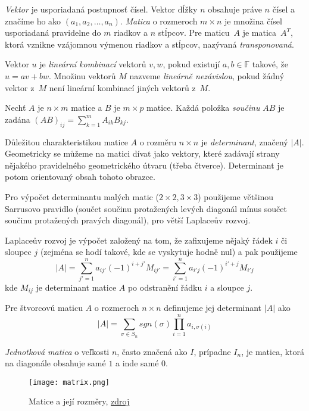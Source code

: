 {\em Vektor} je usporiadaná postupnosť čísel. Vektor dĺžky $n$ obsahuje práve $n$ čísel
a značíme ho ako $(a_1, a_2, \ldots, a_n)$. {\em Matica} o rozmeroch $m \times n$ je množina čísel
usporiadaná pravidelne do $m$ riadkov a $n$ stĺpcov. Pre maticu~$A$ je 
matica~$A^T$, ktorá vznikne vzájomnou výmenou riadkov a stĺpcov,
nazývaná {\em transponovaná}.

Vektor $u$ je {\em lineární kombinací} vektorů $v, w$, pokud existují
$a,b \in \mathbb{F}$ takové, že $u = av + bw$.
Množinu vektorů $M$ nazveme {\em lineárně nezávislou}, pokud žádný
vektor z~$M$ není lineární kombinací jiných vektorů z~$M$.

\begin{definition}
    Nechť $A$ je $n \times m$ matice a $B$ je $m \times p$ matice.
    Každá položka {\em součinu} $AB$ je zadána
    $(AB)_{ij} = \sum^{m}_{k = 1} A_{ik} B_{kj}$.
\end{definition}


Důležitou charakteristikou matice $A$ o rozměru $n \times n$ je {\em
determinant}, značený $\lvert A \rvert$. Geometricky se můžeme na matici
dívat jako vektory, které zadávají strany nějakého pravidelného
geometrického útvaru (třeba čtverce). Determinant je potom orientovaný
obsah tohoto obrazce.

Pro výpočet determinantu malých matic ($2\times2,
3\times3$) použijeme většinou Sarrusovo pravidlo (součet součinu
protažených levých diagonál mínus součet součinu protažených pravých
diagonál), pro větší
Laplaceův rozvoj.

Laplaceův rozvoj je výpočet založený na tom, že zafixujeme nějaký řádek
$i$ či sloupec $j$ (zejména se hodí takové, kde se vyskytuje hodně nul)
a pak použijeme
\[
    \lvert A \rvert
    = \sum_{j' = 1}^{n} a_{ij'} (-1)^{i + j'} M_{ij'}
    = \sum_{i' = 1}^{n} a_{i'j} (-1)^{i' + j} M_{i'j}
\]
kde $M_{ij}$ je determinant matice $A$ po odstranění řádku $i$ a sloupce
$j$.

\begin{definition}
	Pre štvorcovú maticu $A$ o rozmeroch $n \times n$ definujeme jej determinant $|A|$ ako
	\[
		|A|= \sum_{\sigma \in S_n} sgn(\sigma) \prod_{i=1}^n a_{i, \sigma(i)}
	\]
\end{definition}

{\em Jednotková matica} o veľkosti $n$, často značená ako $I$, prípadne $I_n$,
je matica, ktorá na diagonále obsahuje samé $1$ a inde samé $0$.

\begin{figure}[h]
    \centering
    \texttt{[image: matrix.png]}
    \caption{Matice a její rozměry, \href{https://commons.wikimedia.org/wiki/File:Matrix.svg}{zdroj}}
\end{figure}

